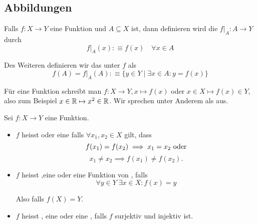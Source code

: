 \subsection{Abbildungen}

\begin{mydef}
  Falls $f:X \to Y$ eine Funktion und $A\subseteq X$ ist, dann definieren wird die  $\left. f \right | _{A} : A \to Y$ durch
  \begin{equation}
    \left. f \right | _{A} (x) :\equiv f(x)  \quad \forall x \in A
  \end{equation}
  
  Des Weiteren definieren wir das  unter $f$ als
  \begin{equation}
    f(A) = \left. f \right |_{A}(A) :\equiv \{y \in Y \mid \exists x \in A : y=f(x) \}
  \end{equation}
\end{mydef}

Für eine Funktion schreibt man $f: X \to Y, x \mapsto f(x)$ oder $x \in X \mapsto f(x) \in Y$, also zum Beispiel $x \in \mathbb{R} \mapsto x^2 \in \mathbb{R}$. Wir sprechen \qt{$\mapsto$} unter Anderem als  aus.

\begin{mydef}
  Sei $f: X \to Y$ eine Funktion.
  \begin{itemize}
    \item $f$ heisst  oder eine  falls $\forall x_1, x_2 \in X$ gilt, dass 
    \begin{equation}
      f(x_1) = f(x_2) \implies x_1 = x_2 $ oder$
    \end{equation}
    \begin{equation}
      x_1 \neq x_2 \implies f(x_1) \neq f(x_2).
    \end{equation}
    
    \item $f$ heisst ,eine  oder eine Funktion von , falls 
    \begin{equation}
      \forall y \in Y \; \exists x \in X: f(x) = y
    \end{equation}
    
    Also falls $f(X) = Y$.
    
    \item $f$ heisst , eine  oder eine , falls $f$ surjektiv und injektiv ist.
  \end{itemize}
\end{mydef}

